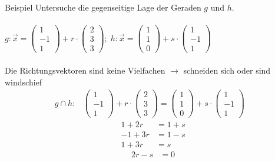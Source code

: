\documentclass{article}
\begin{document}
\begin{boxx}[DarkBlue]{Beispiel}
    Untersuche die gegenseitige Lage der Geraden $g$ und $h$.\\\\
    $\displaystyle g:\vec{x} = \begin{pmatrix}1\\-1\\1\end{pmatrix} + r \cdot \begin{pmatrix}2\\3\\3\end{pmatrix};\; h: \vec{x} = \begin{pmatrix}1\\1\\0\end{pmatrix} + s \cdot \begin{pmatrix}1\\-1\\1\end{pmatrix}$ \\\\
    Die Richtungsvektoren sind keine Vielfachen $\rightarrow$ schneiden sich oder sind windschief
    \begin{align*}
        &&&&&g\cap h: &\begin{pmatrix}1\\-1\\1\end{pmatrix} + r \cdot \begin{pmatrix}2\\3\\3\end{pmatrix} = \begin{pmatrix}1\\1\\0\end{pmatrix} + s \cdot \begin{pmatrix}1\\-1\\1\end{pmatrix}&&&&&&
    \end{align*}
    \begin{align*}
        1+2r &= 1+s \\
        -1+3r &= 1-s \\
        1+ 3r &= s
    \end{align*}
    \begin{align}
        2r - s &= 0 \label{geraden_eq1}\\

\end{align}
\end{boxx}
\end{document}
